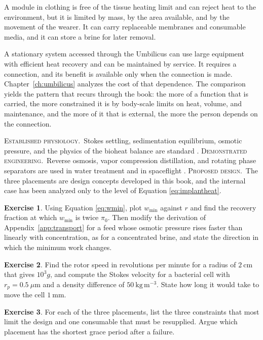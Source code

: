 \documentclass[11pt,openany]{book}
\theoremstyle{definition}
\newtheorem{exercise}{Exercise}[chapter]
\theoremstyle{remark}
\newcommand{\est}{\textsc{Established physiology.}\ }
\newcommand{\dem}{\textsc{Demonstrated engineering.}\ }
\newcommand{\pro}{\textsc{Proposed design.}\ }
\begin{document}
A module in clothing is free of the tissue heating limit and can reject heat to the environment, but it is limited by mass, by the area available, and by the movement of the wearer. It can carry replaceable membranes and consumable media, and it can store a brine for later removal.

A stationary system accessed through the Umbilicus can use large equipment with efficient heat recovery and can be maintained by service. It requires a connection, and its benefit is available only when the connection is made. Chapter~\ref{ch:umbilicus} analyzes the cost of that dependence. The comparison yields the pattern that recurs through the book: the more of a function that is carried, the more constrained it is by body-scale limits on heat, volume, and maintenance, and the more of it that is external, the more the person depends on the connection.

\begin{evidence}
\est Stokes settling, sedimentation equilibrium, osmotic pressure, and the physics of the bioheat balance are standard \cite{bsl2007,cussler2009}. \dem Reverse osmosis, vapor compression distillation, and rotating phase separators are used in water treatment and in spaceflight \cite{eckart1996}. \pro The three placements are design concepts developed in this book, and the internal case has been analyzed only to the level of Equation \eqref{eq:implantheat}.
\end{evidence}

\begin{exercise}
Using Equation \eqref{eq:wmin}, plot $w_{\min}$ against $r$ and find the recovery fraction at which $w_{\min}$ is twice $\pi_0$. Then modify the derivation of Appendix~\ref{app:transport} for a feed whose osmotic pressure rises faster than linearly with concentration, as for a concentrated brine, and state the direction in which the minimum work changes.
\end{exercise}

\begin{exercise}
Find the rotor speed in revolutions per minute for a radius of $2\ \mathrm{cm}$ that gives $10^{3}g$, and compute the Stokes velocity for a bacterial cell with $r_p=0.5\ \mu\mathrm{m}$ and a density difference of $50\ \mathrm{kg\,m^{-3}}$. State how long it would take to move the cell $1\ \mathrm{mm}$.
\end{exercise}

\begin{exercise}
For each of the three placements, list the three constraints that most limit the design and one consumable that must be resupplied. Argue which placement has the shortest grace period after a failure.
\end{exercise}
\end{document}
